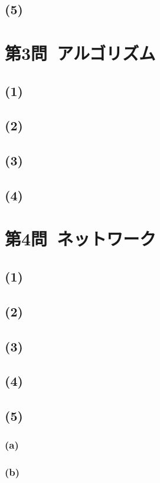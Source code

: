 \documentclass[a4paper,12pt,xelatex,ja=standard]{bxjsarticle}
\begin{document}
  \subsection*{(5)}

\section*{第3問\ アルゴリズム}
  \subsection*{(1)}
  \subsection*{(2)}
  \subsection*{(3)}
  \subsection*{(4)}

\section*{第4問\ ネットワーク}
  \subsection*{(1)}
  \subsection*{(2)}
  \subsection*{(3)}
  \subsection*{(4)}
  \subsection*{(5)}
    \subsubsection*{(a)}
    \subsubsection*{(b)}
\end{document}
